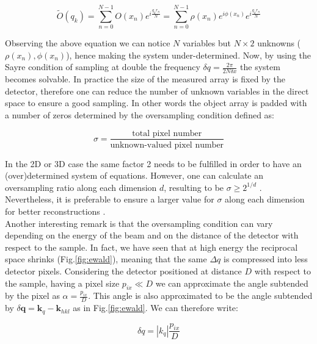 \begin{equation}
    \widetilde{O}(q_k) = \sum_{n = 0}^{N-1}O(x_n)e^{ i \frac{q_{k} r_{n}}{N}} = \sum_{n = 0}^{N-1}\rho(x_n)e^{ i \phi(x_n)}e^{ i \frac{q_{k} r_{n}}{N}} 
\end{equation}

Observing the above equation we can notice $N$ variables but $N\times 2$ unknowns ($\rho(x_n), \phi(x_n)$), hence 
making the system under-determined. Now, by using the Sayre condition of sampling at double the frequency $\delta q = \frac{2\pi}{2 N \delta x}$ 
the system becomes solvable. 
In practice the size of the measured array is fixed by the detector, therefore one can reduce the number of unknown 
variables in the direct space to ensure a good sampling. In other words the object array is padded with a number of zeros 
determined by the oversampling condition defined as: 

\begin{equation}
    \sigma = \frac{\text{total pixel number}}{\text{unknown-valued pixel number}}
\end{equation}

In the 2D or 3D case the same factor 2 needs to be fulfilled in order to have an (over)determined system of equations. However,
one can calculate an oversampling ratio along each dimension $d$, resulting to be $\sigma \ge 2^{1/d}$ \cite{Latychevskaia:18}. 
Nevertheless, it is preferable to ensure a larger value for $\sigma$ along each dimension for better reconstructions \cite{Veen_2004, Ozturk_2017}. \\

Another interesting remark is that the oversampling condition can vary depending on the energy of the beam and on the 
distance of the detector with respect to the sample. 
In fact, we have seen that at high energy the reciprocal space shrinks (Fig.\ref{fig:ewald}), meaning that the same $\Delta q$ is compressed 
into less detector pixels. Considering the detector positioned at distance $D$ with respect to the sample, having a pixel 
size $p_{ix} \ll D$ we can approximate the angle subtended by the pixel as $\alpha = \frac{p_{ix}}{D}$. This angle 
is also approximated to be the angle subtended by $\delta \mathbf{q} = \mathbf{k}_{q} - \mathbf{k}_{hkl} $ as in Fig.\ref{fig:ewald}. 
We can therefore write: 

\begin{equation}
    \delta q = |k_{q}|\frac{p_{ix}}{D} 
\end{equation}

